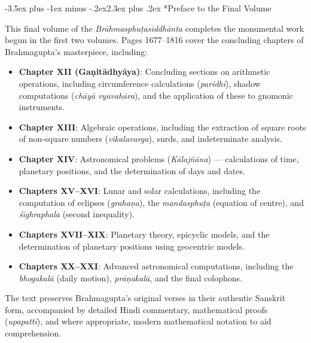 \documentclass[11pt,a4paper]{article}
\makeatletter
\renewcommand{\section}{\@startsection {section}{1}{\z@}%
  {-3.5ex plus -1ex minus -.2ex}{2.3ex plus .2ex}%
  {\normalfont\Large\bfseries\color{sectioncolor}}}
\makeatother
\begin{document}
\tableofcontents
\newpage

\section*{Preface to the Final Volume}

This final volume of the \textit{Br\=ahmasphu\d tasiddh\=anta} completes the monumental work begun in the first two volumes. Pages 1677--1816 cover the concluding chapters of Brahmagupta's masterpiece, including:

\begin{itemize}[leftmargin=2em]
  \item \textbf{Chapter XII (Ga\d nit\=adhy\=aya)}: Concluding sections on arithmetic operations, including circumference calculations (\textit{paridhi}), shadow computations (\textit{ch\=ay\=a vyavah\=ara}), and the application of these to gnomonic instruments.
  \item \textbf{Chapter XIII}: Algebraic operations, including the extraction of square roots of non-square numbers (\textit{vikalavarga}), surds, and indeterminate analysis.
  \item \textbf{Chapter XIV}: Astronomical problems (\textit{K\=alaj\~n\=ana}) --- calculations of time, planetary positions, and the determination of days and dates.
  \item \textbf{Chapters XV--XVI}: Lunar and solar calculations, including the computation of eclipses (\textit{graha\d na}), the \textit{mandasphu\d ta} (equation of centre), and \textit{\'s\=ighraphala} (second inequality).
  \item \textbf{Chapters XVII--XIX}: Planetary theory, epicyclic models, and the determination of planetary positions using geocentric models.
  \item \textbf{Chapters XX--XXI}: Advanced astronomical computations, including the \textit{bhogakal\=a} (daily motion), \textit{pr\=a\d nakal\=a}, and the final colophons.
\end{itemize}

The text preserves Brahmagupta's original verses in their authentic Sanskrit form, accompanied by detailed Hindi commentary, mathematical proofs (\textit{upapatti}), and where appropriate, modern mathematical notation to aid comprehension.
\end{document}
